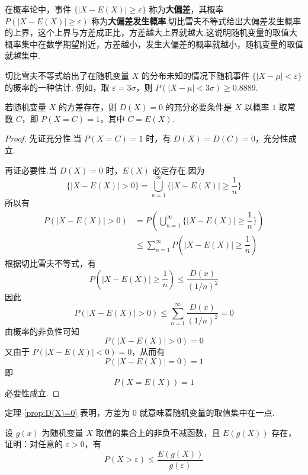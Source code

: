 在概率论中，事件 $\{ |X-E(X)| \geqslant \varepsilon \}$ 称为\textbf{大偏差}，其概率 $P(|X-E(X)| \geqslant \varepsilon)$ 称为\textbf{大偏差发生概率}.切比雪夫不等式给出大偏差发生概率的上界，这个上界与方差成正比，方差越大上界就越大.这说明随机变量的取值大概率集中在数学期望附近，方差越小，发生大偏差的概率就越小，随机变量的取值就越集中.

切比雪夫不等式给出了在随机变量 $X$ 的分布未知的情况下随机事件 $\{ |X-\mu| < \varepsilon \}$ 的概率的一种估计. 例如，取 $\varepsilon = 3\sigma$，则 $P(|X-\mu| < 3\sigma) \geqslant 0.8889$.

\begin{theorem}[][][prop:D(X)=0]
    \indent 若随机变量 $X$ 的方差存在，则 $D(X)=0$ 的充分必要条件是 $X$ 以概率 $1$ 取常数 $C$，即 $P(X=C)=1$，其中 $C=E(X)$.
\end{theorem}

\begin{proof}
    先证充分性.当 $P(X=C)=1$ 时，有 $D(X)=D(C)=0$，充分性成立.

    再证必要性.当 $D(X)=0$ 时，$E(X)$ 必定存在.因为
    $$
    \{ |X-E(X)|>0 \} = \bigcup_{n=1}^{\infty} \{ |X-E(X)| \geqslant \dfrac{1}{n} \}
    $$
    所以有
    $$
    \begin{aligned}
        P(|X-E(X)|>0) &= P \left( \bigcup_{n=1}^{\infty} \{ |X-E(X)| \geqslant \dfrac{1}{n} \} \right) \\
        & \leqslant \sum_{n=1}^{\infty} P(|X-E(X)| \geqslant \dfrac{1}{n})
    \end{aligned}
    $$
    根据切比雪夫不等式，有
    $$
    P(|X-E(X)| \geqslant \dfrac{1}{n}) \leqslant \dfrac{D(x)}{(1/n)^2}
    $$
    因此
    $$
    P(|X-E(X)|>0) \leqslant \sum_{n=1}^{\infty} \dfrac{D(x)}{(1/n)^2} = 0
    $$
    由概率的非负性可知
    $$
    P(|X-E(X)|>0) = 0
    $$
    又由于 $P(|X-E(X)|<0) = 0$，从而有
    $$
    P(|X-E(X)|=0) = 1
    $$
    即
    $$
    P(X=E(X)) = 1
    $$
    必要性成立.
\end{proof}

定理 \ref{prop:D(X)=0} 表明，方差为 $0$ 就意味着随机变量的取值集中在一点.

\begin{example}
    \indent 设 $g(x)$ 为随机变量 $X$ 取值的集合上的非负不减函数，且 $E(g(X))$ 存在，证明：对任意的 $\varepsilon > 0$，有
    $$
    P(X > \varepsilon) \leqslant \dfrac{E(g(X))}{g(\varepsilon)}
    $$
\end{example}

